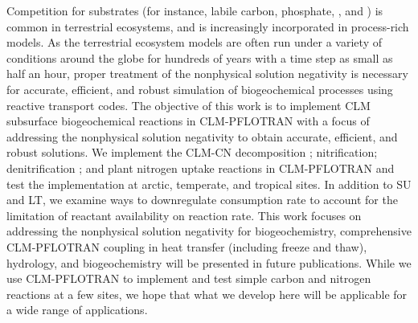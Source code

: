 \documentclass[gmd, manuscript]{copernicus}
\begin{document}
Competition for  substrates (for instance, labile carbon, phosphate, ,
and ) is common in terrestrial ecosystems, and is increasingly
incorporated in process-rich models. As the terrestrial ecosystem models are
often run under a variety of conditions around the globe for hundreds of years
with a time step as small as half an hour, proper treatment of the
nonphysical solution negativity is necessary for accurate, efficient, and robust simulation
of biogeochemical processes using reactive transport codes.
The objective of this work is to implement CLM subsurface
biogeochemical reactions in CLM-PFLOTRAN with a focus of addressing the
nonphysical solution negativity to obtain accurate, efficient, and robust solutions. We
implement the CLM-CN decomposition \citep{Bonan2012,Oleson2013,Thornton2005};
nitrification; denitrification \citep{Dickinson2002,Parton2001,Parton1996}; and
plant nitrogen uptake reactions in CLM-PFLOTRAN and test the implementation at
arctic, temperate, and tropical sites. In addition to SU and LT, %
we examine ways to downregulate consumption rate to account
for the limitation of reactant availability on reaction rate. This work
focuses on addressing the nonphysical solution negativity for biogeochemistry, %
 comprehensive CLM-PFLOTRAN coupling in heat transfer
(including freeze and thaw), hydrology,  and biogeochemistry will be presented
in future publications.  While we use CLM-PFLOTRAN to implement and test simple
carbon and nitrogen reactions at a few sites, we hope that what we develop here
will be applicable for a wide range of applications.





%

\end{document}
